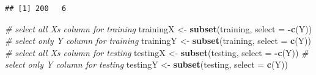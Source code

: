 \documentclass[a4paper,conference]{IEEEtran}
\newenvironment{Shaded}{\begin{snugshade}}{\end{snugshade}}
\newcommand{\AttributeTok}[1]{\textcolor[rgb]{0.13,0.29,0.53}{#1}}
\newcommand{\CommentTok}[1]{\textcolor[rgb]{0.56,0.35,0.01}{\textit{#1}}}
\newcommand{\FunctionTok}[1]{\textcolor[rgb]{0.13,0.29,0.53}{\textbf{#1}}}
\newcommand{\NormalTok}[1]{#1}
\newcommand{\OtherTok}[1]{\textcolor[rgb]{0.56,0.35,0.01}{#1}}
\newcommand{\SpecialCharTok}[1]{\textcolor[rgb]{0.81,0.36,0.00}{\textbf{#1}}}
\begin{document}
\begin{verbatim}
## [1] 200   6
\end{verbatim}

\begin{Shaded}
\begin{Highlighting}[]
\CommentTok{\# select all X\textquotesingle{}s column for training }
\NormalTok{trainingX }\OtherTok{\textless{}{-}} \FunctionTok{subset}\NormalTok{(training, }
                    \AttributeTok{select =} \SpecialCharTok{{-}}\FunctionTok{c}\NormalTok{(Y)) }
\CommentTok{\# select only Y column for training}
\NormalTok{trainingY }\OtherTok{\textless{}{-}} \FunctionTok{subset}\NormalTok{(training,}
                    \AttributeTok{select =} \FunctionTok{c}\NormalTok{(Y)) }
 \CommentTok{\# select all X\textquotesingle{}s column for testing}
\NormalTok{testingX }\OtherTok{\textless{}{-}} \FunctionTok{subset}\NormalTok{(testing,}
                   \AttributeTok{select =} \SpecialCharTok{{-}}\FunctionTok{c}\NormalTok{(Y))}
\CommentTok{\# select only Y column for testing}
\NormalTok{testingY }\OtherTok{\textless{}{-}} \FunctionTok{subset}\NormalTok{(testing, }
                   \AttributeTok{select =} \FunctionTok{c}\NormalTok{(Y)) }
\end{Highlighting}
\end{Shaded}
\end{document}
